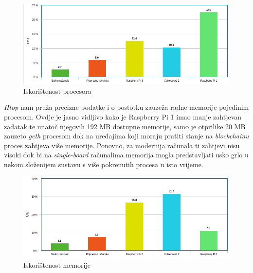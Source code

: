 \documentclass[times, utf8, zavrsni]{fer}
\begin{document}
\begin{figure}[ht]
  \caption{Iskorištenost procesora}
  \centering
  \includegraphics[width=\textwidth]{cpuUtil.png}
\end{figure}

\emph{Htop} nam pruža precizne podatke i o postotku zauzeža radne memorije pojedinim procesom. Ovdje je jasno vidljivo kako je Raspberry Pi 1 imao manje zahtjevan
zadatak te unatoč njegovih 192 MB dostupne memorije, samo je otprilike 20 MB zauzeto \emph{geth} procesom dok na uređajima koji moraju pratiti stanje na \emph{blockchainu}
proces zahtjeva više memorije. Ponovno, za modernija računala ti zahtjevi nisu visoki dok bi na \emph{single-board} računalima memorija mogla predstavljati usko grlo
u nekom složenijem sustavu s više pokrenutih procesa u isto vrijeme.

\begin{figure}[ht]
  \caption{Iskorištenost memorije}
  \centering
  \includegraphics[width=\textwidth]{ramUtil.png}
\end{figure}
\end{document}
